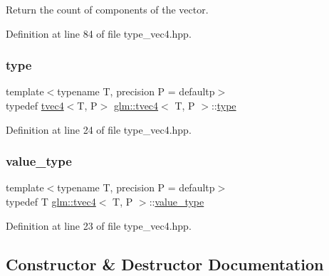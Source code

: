Return the count of components of the vector. 



Definition at line 84 of file type\+\_\+vec4.\+hpp.

\mbox{\label{structglm_1_1tvec4_a8896f36a5499c8908772db7faf59e981}} 
\subsubsection{\texorpdfstring{type}{type}}
{\footnotesize\ttfamily template$<$typename T, precision P = defaultp$>$ \\
typedef \mbox{\hyperlink{structglm_1_1tvec4}{tvec4}}$<$T, P$>$ \mbox{\hyperlink{structglm_1_1tvec4}{glm\+::tvec4}}$<$ T, P $>$\+::\mbox{\hyperlink{structglm_1_1tvec4_a8896f36a5499c8908772db7faf59e981}{type}}}



Definition at line 24 of file type\+\_\+vec4.\+hpp.

\mbox{\label{structglm_1_1tvec4_ac6521112942e4500f26c0c0799b2cfa9}} 
\subsubsection{\texorpdfstring{value\_type}{value\_type}}
{\footnotesize\ttfamily template$<$typename T, precision P = defaultp$>$ \\
typedef T \mbox{\hyperlink{structglm_1_1tvec4}{glm\+::tvec4}}$<$ T, P $>$\+::\mbox{\hyperlink{structglm_1_1tvec4_ac6521112942e4500f26c0c0799b2cfa9}{value\+\_\+type}}}



Definition at line 23 of file type\+\_\+vec4.\+hpp.



\subsection{Constructor \& Destructor Documentation}
\mbox{\label{structglm_1_1tvec4_a3a433743d24c5741c68f7d7f0bcdb427}} 
